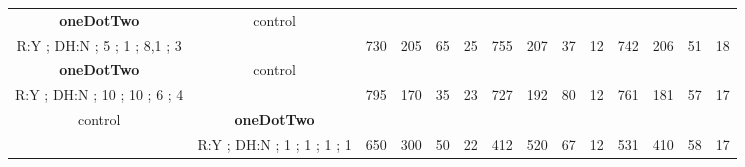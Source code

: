 \begin{table}[]
{\begin{tabular}{|c|c|c|c|c|c|c|c|c|c|c|c|c|c|}
\cellcolor{blue!15}\textbf{oneDotTwo} & control& {\color[HTML]{00009B} } & {\color[HTML]{9A0000} } & {\color[HTML]{009901} } &  & {\color[HTML]{00009B} } & {\color[HTML]{9A0000} } & {\color[HTML]{009901} } &  & {\color[HTML]{00009B} } & {\color[HTML]{9A0000} } & {\color[HTML]{009901} } &  \\ 
\cellcolor{ blue!15}R:Y ; DH:N ; 5 ; 1 ; 8,1 ; 3 &  & \multirow{-2}{*}{{\color[HTML]{00009B} 730}} & \multirow{-2}{*}{{\color[HTML]{9A0000} 205}} & \multirow{-2}{*}{{\color[HTML]{009901} 65}} & \multirow{-2}{*}{25} & \multirow{-2}{*}{{\color[HTML]{00009B} 755}} & \multirow{-2}{*}{{\color[HTML]{9A0000} 207}} & \multirow{-2}{*}{{\color[HTML]{009901} 37}} & \multirow{-2}{*}{12} & \multirow{-2}{*}{{\color[HTML]{00009B} 742}} & \multirow{-2}{*}{{\color[HTML]{9A0000} 206}} & \multirow{-2}{*}{{\color[HTML]{009901} 51}} & \multirow{-2}{*}{18} \\ \hline

\cellcolor{blue!15}\textbf{oneDotTwo} & control& {\color[HTML]{00009B} } & {\color[HTML]{9A0000} } & {\color[HTML]{009901} } &  & {\color[HTML]{00009B} } & {\color[HTML]{9A0000} } & {\color[HTML]{009901} } &  & {\color[HTML]{00009B} } & {\color[HTML]{9A0000} } & {\color[HTML]{009901} } &  \\ 
\cellcolor{ blue!15}R:Y ; DH:N ; 10 ; 10 ; 6 ; 4 &  & \multirow{-2}{*}{{\color[HTML]{00009B} 795}} & \multirow{-2}{*}{{\color[HTML]{9A0000} 170}} & \multirow{-2}{*}{{\color[HTML]{009901} 35}} & \multirow{-2}{*}{23} & \multirow{-2}{*}{{\color[HTML]{00009B} 727}} & \multirow{-2}{*}{{\color[HTML]{9A0000} 192}} & \multirow{-2}{*}{{\color[HTML]{009901} 80}} & \multirow{-2}{*}{12} & \multirow{-2}{*}{{\color[HTML]{00009B} 761}} & \multirow{-2}{*}{{\color[HTML]{9A0000} 181}} & \multirow{-2}{*}{{\color[HTML]{009901} 57}} & \multirow{-2}{*}{17} \\ \hline

control & \cellcolor{blue!15}\textbf{oneDotTwo}& {\color[HTML]{00009B} } & {\color[HTML]{9A0000} } & {\color[HTML]{009901} } &  & {\color[HTML]{00009B} } & {\color[HTML]{9A0000} } & {\color[HTML]{009901} } &  & {\color[HTML]{00009B} } & {\color[HTML]{9A0000} } & {\color[HTML]{009901} } &  \\ 
 & \cellcolor{ blue!15}R:Y ; DH:N ; 1 ; 1 ; 1 ; 1 & \multirow{-2}{*}{{\color[HTML]{00009B} 650}} & \multirow{-2}{*}{{\color[HTML]{9A0000} 300}} & \multirow{-2}{*}{{\color[HTML]{009901} 50}} & \multirow{-2}{*}{22} & \multirow{-2}{*}{{\color[HTML]{00009B} 412}} & \multirow{-2}{*}{{\color[HTML]{9A0000} 520}} & \multirow{-2}{*}{{\color[HTML]{009901} 67}} & \multirow{-2}{*}{12} & \multirow{-2}{*}{{\color[HTML]{00009B} 531}} & \multirow{-2}{*}{{\color[HTML]{9A0000} 410}} & \multirow{-2}{*}{{\color[HTML]{009901} 58}} & \multirow{-2}{*}{17} \\ \hline


\end{tabular}}
\end{table}
